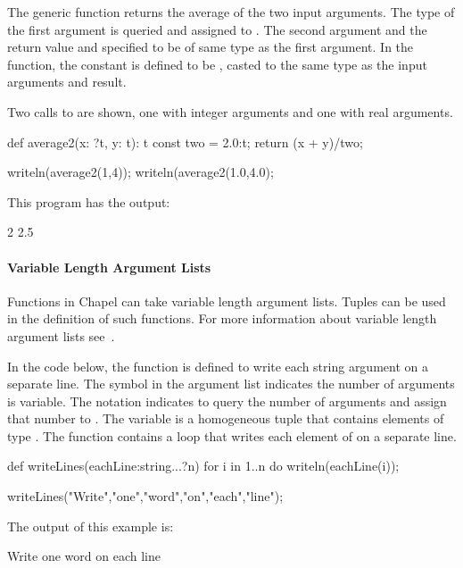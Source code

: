 \begin{example}
The generic function  returns the average of the
two input arguments.  The type of the first argument  is
queried and assigned to .  The second argument 
and the return value and specified to be of same type as the first
argument.  In the function, the constant  is defined to
be , casted to the same type as the input arguments and result.

Two calls to  are shown, one with integer arguments and one
with real arguments.  
\begin{chapel}
def average2(x: ?t, y: t): t {
  const two = 2.0:t;
  return (x + y)/two;
}

writeln(average2(1,4));
writeln(average2(1.0,4.0);
\end{chapel}

This program has the output:
\begin{commandline}
2
2.5
\end{commandline}
\end{example}

\paragraph{Variable Length Argument Lists}
Functions in Chapel can take variable length argument lists.
Tuples can be used in the definition of such functions.
For more information about variable length argument lists 
see~.

\begin{example}
In the code below, the function  is defined to write
each string argument on a separate line.  The symbol  in the
argument list indicates the number of arguments is variable.  The
notation  indicates to query the number of arguments and
assign that number to .  The variable  is a
homogeneous tuple that contains  elements of
type .  The function contains a  loop that
writes each element of
 on a separate line.

\begin{chapel}
def writeLines(eachLine:string...?n) {
  for i in 1..n do 
    writeln(eachLine(i));
}

writeLines("Write","one","word","on","each","line"); 
\end{chapel}

The output of this example is:
\begin{commandline}
Write
one
word
on
each
line
\end{commandline}
\end{example}




